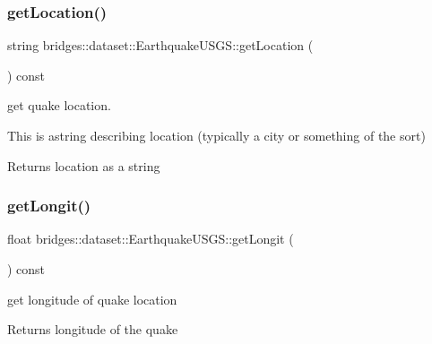\subsubsection{\texorpdfstring{get\+Location()}{getLocation()}}
{\footnotesize\ttfamily string bridges\+::dataset\+::\+Earthquake\+U\+S\+G\+S\+::get\+Location (\begin{DoxyParamCaption}{ }\end{DoxyParamCaption}) const\hspace{0.3cm}{\ttfamily [inline]}}



get quake location. 

This is astring describing location (typically a city or something of the sort)

\begin{DoxyReturn}{Returns}
location as a string 
\end{DoxyReturn}
\mbox{\label{classbridges_1_1dataset_1_1_earthquake_u_s_g_s_aab856d62ca076b54fff0e2b2a6b131d9}} 
\subsubsection{\texorpdfstring{get\+Longit()}{getLongit()}}
{\footnotesize\ttfamily float bridges\+::dataset\+::\+Earthquake\+U\+S\+G\+S\+::get\+Longit (\begin{DoxyParamCaption}{ }\end{DoxyParamCaption}) const\hspace{0.3cm}{\ttfamily [inline]}}



get longitude of quake location 

\begin{DoxyReturn}{Returns}
longitude of the quake 
\end{DoxyReturn}
\mbox{\label{classbridges_1_1dataset_1_1_earthquake_u_s_g_s_aeb1be6b0dece1240da3123db9f9c2d9b}} 
